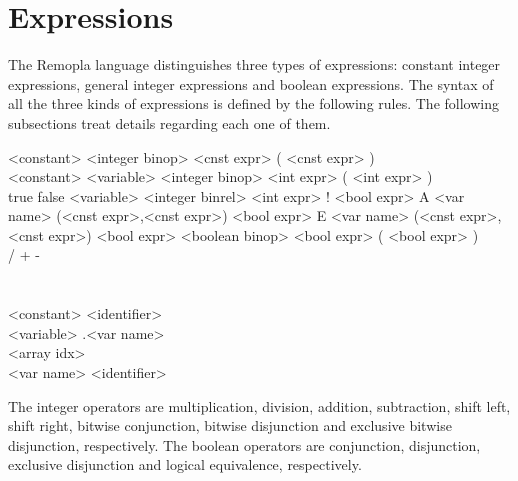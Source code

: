 \documentclass[a4paper,11pt,titlepage,english]{article}
\begin{document}
\section{Expressions\label{s:expr}}

The Remopla language distinguishes three types of expressions: constant
integer expressions, general integer expressions and boolean expressions.
The syntax of all the three kinds of expressions is defined by the
following rules. The following subsections treat details regarding each
one of them.

\begin{bnfgrammar}
  \or <constant>
     <integer binop> <cnst expr>
    \or ( <cnst expr> )
    \\
[int expr]  \or <constant> \or <variable>
     <integer binop> <int expr>
    \or ( <int expr> )
    \\
[bool expr] \is true \or false \or <variable>
     <integer binrel> <int expr>
    \or ! <bool expr>
    \or A <var name> (<cnst expr>,<cnst expr>) <bool expr>
    \or E <var name> (<cnst expr>,<cnst expr>) <bool expr>
     <boolean binop> <bool expr>
    \or ( <bool expr> )
    \\
[integer binop] \is * \or / \or + \or - \or \bitlsh \or \bitrsh \or \bitand \or \bitor \or \bitxor \\
[integer binrel] \is \remlt \or \remle \or \remeq \or \remne \or \remge \or \remgt \\
[boolean binop] \is \booland \or \boolor \or \boolxor \or \booleq \\
<constant> \is <identifier> \\
<variable> 
    .<var name>
    \\
<array idx>  \\
<var name> \is <identifier> \\
\end{bnfgrammar}

The integer operators are multiplication, division, addition, subtraction,
shift left, shift right, bitwise conjunction, bitwise disjunction and
exclusive bitwise disjunction, respectively. The boolean operators are
conjunction, disjunction, exclusive disjunction and logical equivalence,
respectively.


\end{document}
